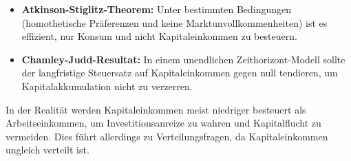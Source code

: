 \begin{itemize}
    \item \textbf{Atkinson-Stiglitz-Theorem:} Unter bestimmten Bedingungen (homothetische Präferenzen und keine Marktunvollkommenheiten) ist es effizient, nur Konsum und nicht Kapitaleinkommen zu besteuern.
    \item \textbf{Chamley-Judd-Resultat:} In einem unendlichen Zeithorizont-Modell sollte der langfristige Steuersatz auf Kapitaleinkommen gegen null tendieren, um Kapitalakkumulation nicht zu verzerren.
\end{itemize}

\begin{remark}
In der Realität werden Kapitaleinkommen meist niedriger besteuert als Arbeitseinkommen, um Investitionsanreize zu wahren und Kapitalflucht zu vermeiden. Dies führt allerdings zu Verteilungsfragen, da Kapitaleinkommen ungleich verteilt ist.
\end{remark}

